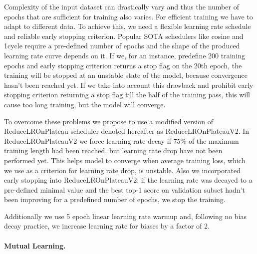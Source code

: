 \documentclass[runningheads]{llncs}
\begin{document}
Complexity of the input dataset can drastically vary and thus the number of epochs that are sufficient for training also varies.
For efficient training we have to adapt to different data. To achieve this, we need a flexible learning rate schedule and
reliable early stopping criterion. Popular SOTA schedulers like cosine \cite{Loshchilov2017SGDRSG} and 1cycle\cite{Smith2019SuperconvergenceVF}
require a pre-defined number of epochs and the shape of the produced learning rate curve depends on it. If we, for an instance,
predefine 200 training epochs and early stopping criterion returns a stop flag on the 20th epoch, the training will be stopped at an unstable
state of the model, because convergence hasn't been reached yet. If we take into account this drawback and prohibit early stopping criterion
returning a stop flag till the half of the training pass, this will cause too long training, but the model will converge.

To overcome these problems we propose to use a modified version of ReduceLROnPlateau\cite{reduceonplateau} scheduler denoted hereafter as ReduceLROnPlateauV2.
In ReduceLROnPlateauV2 we force learning rate decay if 75\% of the maximum training length had been reached,
but learning rate drop have not been performed yet.
This helps model to converge when average training loss, which we use as a criterion for learning rate drop, is unstable.
Also we incorporated early stopping into ReduceLROnPlateauV2: if the learning rate was decayed to a pre-defined minimal value and the best
top-1 score on validation subset hadn't been improving for a predefined number of epochs, we stop the training.

Additionally we use 5 epoch linear learning rate warmup and, following no bias decay practice, we increase
learning rate for biases by a factor of 2.

\paragraph{Mutual Learning.}
\end{document}
